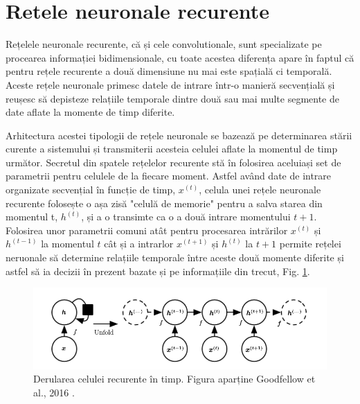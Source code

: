 \documentclass[a4paper,12pt]{book}
\begin{document}
			\section{Retele neuronale recurente} \label{RNN}
				
				Rețelele neuronale recurente, că și cele convolutionale, sunt specializate pe procearea informației bidimensionale, cu toate acestea diferența apare în faptul că pentru rețele recurente a două dimensiune nu mai este spațială ci temporală. Aceste rețele neuronale primesc datele de intrare într-o manieră secvențială și reușesc să depisteze relațiile temporale dintre două sau mai multe segmente de date aflate la momente de timp diferite. \par
				
				Arhitectura acestei tipologii de rețele neuronale se bazează pe determinarea stării curente a sistemului și transmiterii acesteia celulei aflate la momentul de timp următor. Secretul din spatele rețelelor recurente stă în folosirea aceluiași set de parametrii pentru celulele de la fiecare moment. Astfel având date de intrare organizate secvențial în funcție de timp, $x^{(t)}$, celula unei rețele neuronale recurente folosește o așa zisă "celulă de memorie" pentru a salva starea din momentul t, $h^{(t)}$, și a o transimte ca o a două intrare momentului $t+1$. Folosirea unor parametrii comuni atât pentru procesarea intrărilor $x^{(t)}$ și $h^{(t-1)}$ la momentul $t$ cât și a intrarlor $x^{(t+1)}$ și $h^{(t)}$ la $t+1$ permite rețelei neruonale să determine relațiile temporale între aceste două momente diferite și astfel să ia decizii în prezent bazate și pe informațiile din trecut, Fig. \ref{fig:unfolding}. 
				
				\begin{figure}[h]
					\centering
					\includegraphics[scale=0.45]{unfolding}
					\caption{Derularea celulei recurente în timp. Figura aparține Goodfellow et al., 2016 \cite{dpb}.}
					\label{fig:unfolding}
				\end{figure}
				
\end{document}

